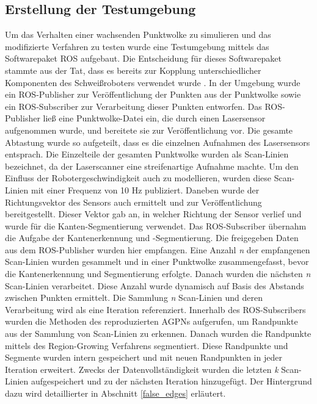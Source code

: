 \subsection{Erstellung der Testumgebung}
Um das Verhalten einer wachsenden Punktwolke zu simulieren und das modifizierte Verfahren zu testen wurde eine Testumgebung mittels das Softwarepaket ROS aufgebaut. Die Entscheidung für dieses Softwarepaket stammte aus der Tat, dass es bereits zur Kopplung unterschiedlicher Komponenten des Schweißroboters verwendet wurde \autocite[39]{savla_intelligente_2022}. In der Umgebung wurde ein ROS-Publisher zur Veröffentlichung der Punkten aus der Punktwolke sowie ein ROS-Subscriber zur Verarbeitung dieser Punkten entworfen. Das ROS-Publisher ließ eine Punktwolke-Datei ein, die durch einen Lasersensor aufgenommen wurde, und bereitete sie zur Veröffentlichung vor. Die gesamte Abtastung wurde so aufgeteilt, dass es die einzelnen Aufnahmen des Lasersensors entsprach. Die Einzelteile der gesamten Punktwolke wurden als Scan-Linien bezeichnet, da der Laserscanner eine streifenartige Aufnahme machte. Um den Einfluss der Robotergeschwindigkeit auch zu modellieren, wurden diese Scan-Linien mit einer Frequenz von 10 Hz publiziert. Daneben wurde der Richtungsvektor des Sensors auch ermittelt und zur Veröffentlichung bereitgestellt. Dieser Vektor gab an, in welcher Richtung der Sensor verlief und wurde für die Kanten-Segmentierung verwendet. Das ROS-Subscriber übernahm die Aufgabe der Kantenerkennung und -Segmentierung. Die freigegeben Daten aus dem ROS-Publisher wurden hier empfangen. Eine Anzahl \textit{n} der empfangenen Scan-Linien wurden gesammelt und in einer Punktwolke zusammengefasst, bevor die Kantenerkennung und Segmentierung erfolgte. Danach wurden die nächsten \textit{n} Scan-Linien verarbeitet. Diese Anzahl wurde dynamisch auf Basis des Abstands zwischen Punkten ermittelt. Die Sammlung \textit{n} Scan-Linien und deren Verarbeitung wird als eine Iteration referenziert. Innerhalb des ROS-Subscribers wurden die Methoden des reproduzierten AGPNs aufgerufen, um Randpunkte aus der Sammlung von Scan-Linien zu erkennen. Danach wurden die Randpunkte mittels des Region-Growing Verfahrens segmentiert. Diese Randpunkte und Segmente wurden intern gespeichert und mit neuen Randpunkten in jeder Iteration erweitert. Zwecks der Datenvollständigkeit wurden die letzten \textit{k} Scan-Linien aufgespeichert und zu der nächsten Iteration hinzugefügt. Der Hintergrund dazu wird detaillierter in Abschnitt \ref{false_edges} erläutert.

